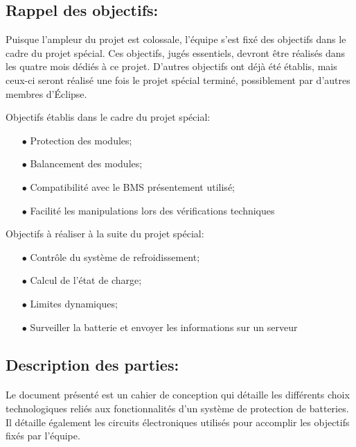 	\subsection{Rappel des objectifs:}		
		Puisque l'ampleur du projet est colossale, l'équipe s'est fixé des objectifs dans le cadre du projet spécial. Ces objectifs, jugés essentiels, devront être réalisés dans les quatre mois dédiés à ce projet. D'autres objectifs ont déjà été établis, mais ceux-ci seront réalisé une fois le projet spécial terminé, possiblement par d'autres membres d'Éclipse.
		
		Objectifs établis dans le cadre du projet spécial:
		
			\begin{itemize}
				\item[$\bullet$] Protection des modules;
				\item[$\bullet$] Balancement des modules;
				\item[$\bullet$] Compatibilité avec le BMS présentement utilisé;
				\item[$\bullet$] Facilité les manipulations lors des vérifications techniques
			\end{itemize}
				
		Objectifs à réaliser à la suite du projet spécial:
		
			\begin{itemize}
				\item[$\bullet$] Contrôle du système de refroidissement;
				\item[$\bullet$] Calcul de l'état de charge;
				\item[$\bullet$] Limites dynamiques;
				\item[$\bullet$] Surveiller la batterie et envoyer les informations sur un serveur
			\end{itemize}		
	
	\subsection{Description des parties:}
		\paragraph*{}			
		Le document présenté est un cahier de conception qui détaille les différents choix technologiques reliés aux fonctionnalités d'un système de protection de batteries. Il détaille également les circuits électroniques utilisés pour accomplir les objectifs fixés par l'équipe.
		

